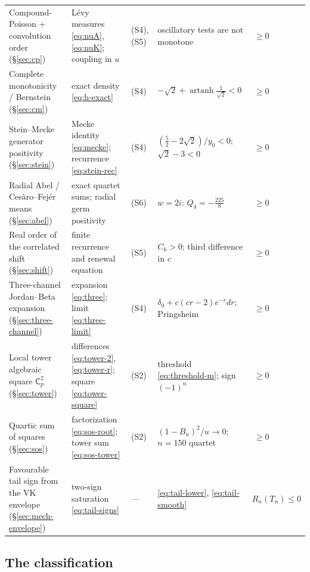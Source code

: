 \documentclass[11pt]{amsart}
\theoremstyle{definition}
\theoremstyle{remark}
\theoremstyle{definition}
\newcommand{\artanh}{\operatorname{artanh}}
\newcommand{\Cc}{\mathsf{C}}
\begin{document}
{\begin{longtable}{@{}p{}p{}p{}p{}p{}@{}}
Compound-Poisson + convolution order (\S\ref{sec:cp})
& L\'evy measures \eqref{eq:nuA}, \eqref{eq:nuK}; coupling in $u$
& (S4),(S5)
& oscillatory tests are not monotone
& $\ \ge0$ \\[2pt]
Complete monotonicity / Bernstein (\S\ref{sec:cm})
& exact density \eqref{eq:h-exact}
& (S4)
& $-\sqrt2+\artanh\tfrac1{\sqrt2}<0$
& $\ \ge0$ \\[2pt]
Stein--Mecke generator positivity (\S\ref{sec:stein})
& Mecke identity \eqref{eq:mecke}; recurrence \eqref{eq:stein-rec}
& (S4)
& $(\tfrac52-2\sqrt2)/y_0<0$; $\sqrt2-3<0$
& $\ \ge0$ \\[2pt]
Radial Abel / Ces\`aro--Fej\'er means (\S\ref{sec:abel})
& exact quartet sums; radial germ positivity
& (S6)
& $w=2i$: $Q_4=-\tfrac{225}{8}$
& $\ \ge0$ \\[2pt]
Real order of the correlated shift (\S\ref{sec:shift})
& finite recurrence and renewal equation
& (S5)
& $C_6>0$; third difference in $c$
& $\ \ge0$ \\[2pt]
Three-channel Jordan--Beta expansion (\S\ref{sec:three-channel})
& expansion \eqref{eq:three}; limit \eqref{eq:three-limit}
& (S4)
& $\delta_0+c(cr-2)e^{-r}dr$; Pringsheim
& $\ \ge0$ \\[2pt]
Local tower algebraic square $\Cc_p^2$ (\S\ref{sec:tower})
& differences \eqref{eq:tower-2}, \eqref{eq:tower-r}; square \eqref{eq:tower-square}
& (S2)
& threshold \eqref{eq:threshold-m}; sign $(-1)^n$
& $\ \ge0$ \\[2pt]
Quartic sum of squares (\S\ref{sec:sos})
& factorization \eqref{eq:sos-root}; tower sum \eqref{eq:sos-tower}
& (S2)
& $(1-B_u)^2/u\to0$; $n=150$ quartet
& $\ \ge0$ \\
\midrule
Favourable tail sign from the VK envelope (\S\ref{sec:mech-envelope})
& two-sign saturation \eqref{eq:tail-signs}
& ---
& \eqref{eq:tail-lower}, \eqref{eq:tail-smooth}
& $R_n(T_n)\le0$ \\
\end{longtable}
}

\subsection{The classification}
\end{document}
